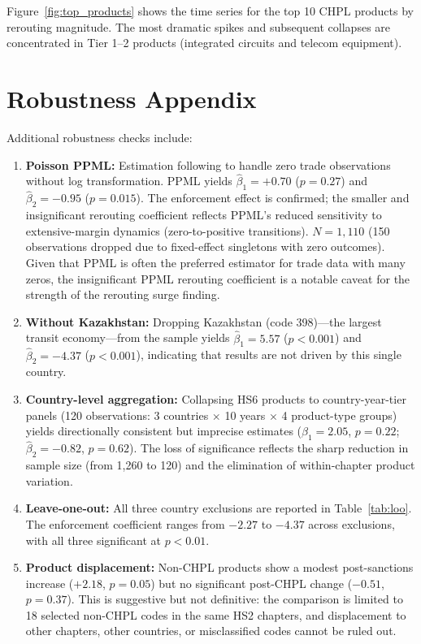 \documentclass[12pt]{article}
\begin{document}
Figure~\ref{fig:top_products} shows the time series for the top 10 CHPL products by rerouting magnitude. The most dramatic spikes and subsequent collapses are concentrated in Tier 1--2 products (integrated circuits and telecom equipment).


\section{Robustness Appendix}
\label{app:robustness}

Additional robustness checks include:

\begin{enumerate}
\item \textbf{Poisson PPML:} Estimation following \citet{silva2006log} to handle zero trade observations without log transformation. PPML yields $\hat{\beta}_1 = +0.70$ ($p = 0.27$) and $\hat{\beta}_2 = -0.95$ ($p = 0.015$). The enforcement effect is confirmed; the smaller and insignificant rerouting coefficient reflects PPML's reduced sensitivity to extensive-margin dynamics (zero-to-positive transitions). $N = 1{,}110$ (150 observations dropped due to fixed-effect singletons with zero outcomes). Given that PPML is often the preferred estimator for trade data with many zeros, the insignificant PPML rerouting coefficient is a notable caveat for the strength of the rerouting surge finding.
\item \textbf{Without Kazakhstan:} Dropping Kazakhstan (code 398)---the largest transit economy---from the sample yields $\hat{\beta}_1 = 5.57$ ($p < 0.001$) and $\hat{\beta}_2 = -4.37$ ($p < 0.001$), indicating that results are not driven by this single country.
\item \textbf{Country-level aggregation:} Collapsing HS6 products to country-year-tier panels (120 observations: 3 countries $\times$ 10 years $\times$ 4 product-type groups) yields directionally consistent but imprecise estimates ($\hat{\beta}_1 = 2.05$, $p = 0.22$; $\hat{\beta}_2 = -0.82$, $p = 0.62$). The loss of significance reflects the sharp reduction in sample size (from 1,260 to 120) and the elimination of within-chapter product variation.
\item \textbf{Leave-one-out:} All three country exclusions are reported in Table~\ref{tab:loo}. The enforcement coefficient ranges from $-2.27$ to $-4.37$ across exclusions, with all three significant at $p < 0.01$.
\item \textbf{Product displacement:} Non-CHPL products show a modest post-sanctions increase ($+2.18$, $p = 0.05$) but no significant post-CHPL change ($-0.51$, $p = 0.37$). This is suggestive but not definitive: the comparison is limited to 18 selected non-CHPL codes in the same HS2 chapters, and displacement to other chapters, other countries, or misclassified codes cannot be ruled out.

\end{enumerate}
\end{document}
